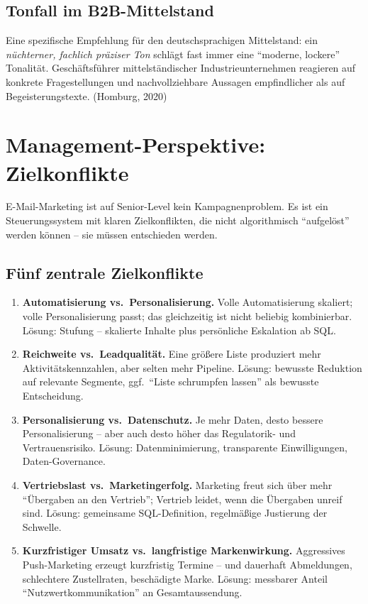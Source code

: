 \documentclass[11pt,a4paper,oneside]{article}
\newcommand{\quelle}[1]{{\footnotesize\color{lpGray}(#1)}}
\begin{document}
\subsection{Tonfall im B2B-Mittelstand}

Eine spezifische Empfehlung für den deutschsprachigen Mittelstand: ein \emph{nüchterner, fachlich präziser Ton} schlägt fast immer eine ``moderne, lockere'' Tonalität. Geschäftsführer mittelständischer Industrieunternehmen reagieren auf konkrete Fragestellungen und nachvollziehbare Aussagen empfindlicher als auf Begeisterungstexte. \quelle{Homburg, 2020}

\section{Management-Perspektive: Zielkonflikte}

E-Mail-Marketing ist auf Senior-Level kein Kampagnenproblem. Es ist ein Steuerungssystem mit klaren Zielkonflikten, die nicht algorithmisch ``aufgelöst'' werden können -- sie müssen entschieden werden.

\subsection{Fünf zentrale Zielkonflikte}

\begin{enumerate}
  \item \textbf{Automatisierung vs.\ Personalisierung.} Volle Automatisierung skaliert; volle Personalisierung passt; das gleichzeitig ist nicht beliebig kombinierbar. Lösung: Stufung -- skalierte Inhalte plus persönliche Eskalation ab SQL.
  \item \textbf{Reichweite vs.\ Leadqualität.} Eine größere Liste produziert mehr Aktivitätskennzahlen, aber selten mehr Pipeline. Lösung: bewusste Reduktion auf relevante Segmente, ggf.\ ``Liste schrumpfen lassen'' als bewusste Entscheidung.
  \item \textbf{Personalisierung vs.\ Datenschutz.} Je mehr Daten, desto bessere Personalisierung -- aber auch desto höher das Regulatorik- und Vertrauensrisiko. Lösung: Datenminimierung, transparente Einwilligungen, Daten-Governance.
  \item \textbf{Vertriebslast vs.\ Marketingerfolg.} Marketing freut sich über mehr ``Übergaben an den Vertrieb''; Vertrieb leidet, wenn die Übergaben unreif sind. Lösung: gemeinsame SQL-Definition, regelmäßige Justierung der Schwelle.
  \item \textbf{Kurzfristiger Umsatz vs.\ langfristige Markenwirkung.} Aggressives Push-Marketing erzeugt kurzfristig Termine -- und dauerhaft Abmeldungen, schlechtere Zustellraten, beschädigte Marke. Lösung: messbarer Anteil ``Nutzwertkommunikation'' an Gesamtaussendung.
\end{enumerate}
\end{document}
